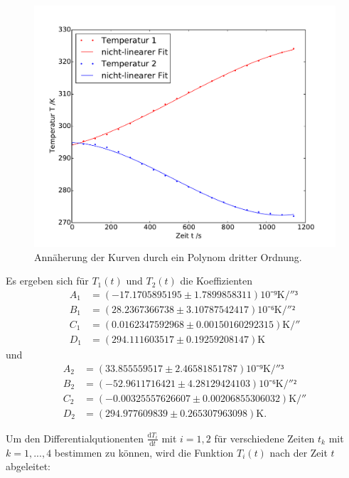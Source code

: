 \begin{figure}
\includegraphics[width=\textwidth]{Bilder/Temperaturfit.pdf}
	\caption{Annäherung der Kurven durch ein Polynom dritter Ordnung.}
\end{figure}
\newpage
Es ergeben sich für $T_1(t)$ und $T_2(t)$ die Koeffizienten 
\begin{equation}
\begin{split}
A_1&=(-17.1705895195\pm1.7899858311)10⁻⁹\si{\kelvin\per{\second}³}\\
B_1&=(28.2367366738\pm3.10787542417)10⁻⁶\si{\kelvin\per{\second}²}\\
C_1&=(0.0162347592968\pm0.00150160292315)\si{\kelvin\per{\second}}\\
D_1&=(294.111603517\pm0.19259208147)\si{\kelvin}
\end{split}
\end{equation}
und
\begin{equation}
\begin{split}
A_2&=(33.855559517\pm2.46581851787)10⁻⁹\si{\kelvin\per{\second}³}\\
B_2&=(-52.9611716421\pm4.28129424103)10⁻⁶\si{\kelvin\per{\second}²}\\
C_2&=(-0.00325557626607\pm0.00206855306032)\si{\kelvin\per{\second}}\\
D_2&=(294.977609839\pm0.265307963098)\si{\kelvin}.
\end{split}
\end{equation}

Um den Differentialqutionenten $\frac{\mathup{d}T_i}{\mathup{d}t}$ mit $i=1,2$ für verschiedene Zeiten $t_k$ mit $k=1,...,4$ bestimmen zu können, wird die Funktion $T_i(t)$ nach der Zeit $t$ abgeleitet:

